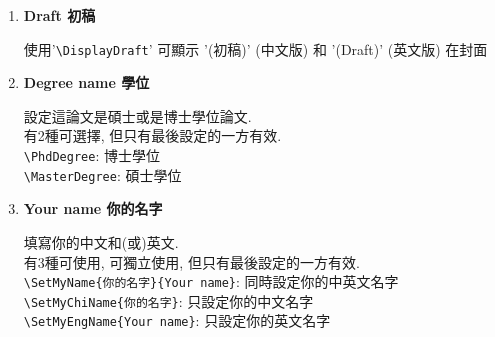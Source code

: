 \begin{enumerate}
{    有3種可使用, 可獨立使用, 但只有最後設定的一方有效\\
    \verb|\SetTitle{你的題目}{Your Title}|: 同時設定中英文題目\\
    \verb|\SetChiTitle{你的題目}|: 只設定中文題目\\
    \verb|\SetEngTitle{Your Title}|: 只設定英文題目\\

    如:\\
    \verb|\SetTitle %|\\
    \verb|{中文題目中文題目} %|\\
    \verb|{Your Title Your Title}|\\
    \verb|'%'|是必須的, 是用來跟LaTex說這3行是同一句話.

    或\\
    \verb|\SetChiTitle{中文題目中文題目}|\\
    \verb|\SetEngTitle{Your Title \\ Your Title}|

    圖書館說不管你是編寫中英混合或全英文版, 都\textbf{必須}同時存在中英題目.
  } %

  \item
  {
    \textbf{Draft 初稿}

    使用'\verb|\DisplayDraft|' 可顯示 '(初稿)' (中文版) 和 '(Draft)' (英文版) 在封面
  } %

  \item
  {
    \textbf{Degree name 學位}

    設定這論文是碩士或是博士學位論文.\\
    有2種可選擇, 但只有最後設定的一方有效.\\
    \verb|\PhdDegree|: 博士學位\\
    \verb|\MasterDegree|: 碩士學位
  } %

  \item
  {
    \textbf{Your name 你的名字}

    填寫你的中文和(或)英文.\\
    有3種可使用, 可獨立使用, 但只有最後設定的一方有效.\\
    \verb|\SetMyName{你的名字}{Your name}|: 同時設定你的中英文名字\\
    \verb|\SetMyChiName{你的名字}|: 只設定你的中文名字\\
    \verb|\SetMyEngName{Your name}|: 只設定你的英文名字
  } %


\end{enumerate}
